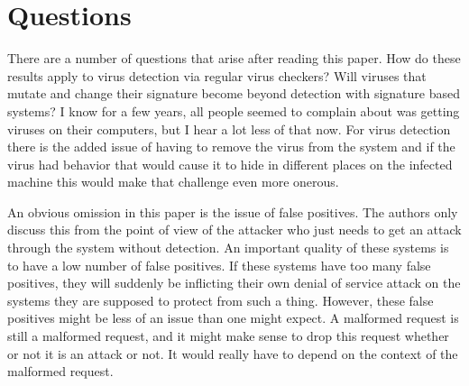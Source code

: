 \documentclass{reading_glasses}
\begin{document}
\section{Questions}
There are a number of questions that arise after reading this paper.  How do these results apply to virus detection via regular virus checkers?  Will viruses that mutate and change their signature become beyond detection with signature based systems?  I know for a few years, all people seemed to complain about was getting viruses on their computers, but I hear a lot less of that now.  For virus detection there is the added issue of having to remove the virus from the system and if the virus had behavior that would cause it to hide in different places on the infected machine this would make that challenge even more onerous.  

An obvious omission in this paper is the issue of false positives.  The authors only discuss this from the point of view of the attacker who just needs to get an attack through the system without detection.  An important quality of these systems is to have a low number of false positives.  If these systems have too many false positives, they will suddenly be inflicting their own denial of service attack on the systems they are supposed to protect from such a thing.  However, these false positives might be less of an issue than one might expect.  A malformed request is still a malformed request, and it might make sense to drop this request whether or not it is an attack or not.  It would really have to depend on the context of the malformed request.




\end{document}
